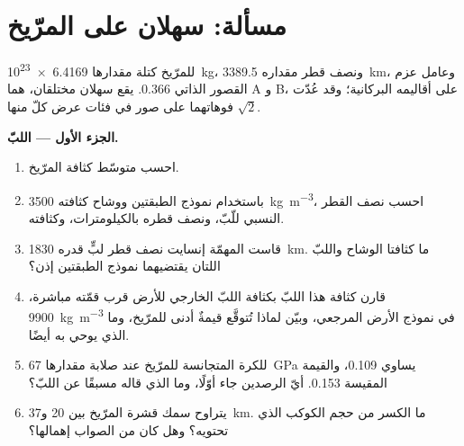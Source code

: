 \section{مسألة: سهلان على المرّيخ}

\begin{problem}
\label{pb:b3:planetary-interiors-surfaces:1}
للمرّيخ كتلة مقدارها \qty{6.4169e23}{kg}، ونصف قطر مقداره \qty{3389.5}{km}،
وعامل عزم القصور الذاتي 0.366. يقع سهلان مختلقان، هما A و B، على
أقاليمه البركانية؛ وقد عُدّت فوهاتهما على صور في فئات
عرض كلّ منها $\sqrt2$.

\medskip\noindent\textbf{الجزء الأول --- اللبّ.}
\begin{enumerate}
\item احسب متوسّط كثافة المرّيخ.
\item باستخدام نموذج الطبقتين ووشاح كثافته \qty{3500}{kg.m^{-3}}، احسب
  نصف القطر النسبي للّبّ، ونصف قطره بالكيلومترات،
  وكثافته.
\item قاست المهمّة إنسايت نصف قطر لبٍّ قدره \qty{1830}{km}. ما كثافتا الوشاح واللبّ
  اللتان يقتضيهما نموذج الطبقتين إذن؟
\item قارن كثافة هذا اللبّ بكثافة اللبّ الخارجي للأرض
  قرب قمّته مباشرة، \qty{9900}{kg.m^{-3}} في نموذج الأرض المرجعي،
  وبيّن لماذا تُتوقَّع قيمةٌ أدنى للمرّيخ، وما الذي يوحي به
  أيضًا.
\item {} للكرة المتجانسة للمرّيخ عند صلابة مقدارها
  \qty{67}{GPa} يساوي 0.109، والقيمة المقيسة 0.153. أيّ الرصدين جاء
  أوّلًا، وما الذي قاله مسبقًا عن اللبّ؟
\item يتراوح سمك قشرة المرّيخ بين 20 و\qty{37}{km}. ما الكسر من
  حجم الكوكب الذي تحتويه؟ وهل كان من الصواب إهمالها؟
\end{enumerate}


\end{problem}
